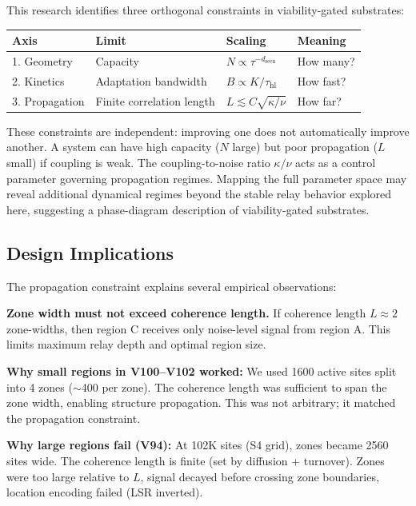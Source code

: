 \documentclass[11pt]{article}
\begin{document}
This research identifies three orthogonal constraints in viability-gated substrates:

\begin{table}[h]
\centering
\begin{tabular}{llll}
\hline
\textbf{Axis} & \textbf{Limit} & \textbf{Scaling} & \textbf{Meaning} \\
\hline
1. Geometry & Capacity & $N \propto \tau^{-d_{\text{seen}}}$ & How many? \\
2. Kinetics & Adaptation bandwidth & $B \propto K / \tau_{\text{hl}}$ & How fast? \\
3. Propagation & Finite correlation length & $L \lesssim C\sqrt{\kappa/\nu}$ & How far? \\
\hline
\end{tabular}
\end{table}

These constraints are independent: improving one does not automatically improve another. A system can have high capacity ($N$ large) but poor propagation ($L$ small) if coupling is weak.
The coupling-to-noise ratio $\kappa/\nu$ acts as a control parameter governing propagation regimes. Mapping the full parameter space may reveal additional dynamical regimes beyond the stable relay behavior explored here, suggesting a phase-diagram description of viability-gated substrates.

\subsection{Design Implications}

The propagation constraint explains several empirical observations:

\textbf{Zone width must not exceed coherence length.} If coherence length $L \approx 2$ zone-widths, then region C receives only noise-level signal from region A. This limits maximum relay depth and optimal region size.

\textbf{Why small regions in V100--V102 worked:} We used 1600 active sites split into 4 zones ($\sim$400 per zone). The coherence length was sufficient to span the zone width, enabling structure propagation. This was not arbitrary; it matched the propagation constraint.

\textbf{Why large regions fail (V94):} At 102K sites (S4 grid), zones became 2560 sites wide. The coherence length is finite (set by diffusion + turnover). Zones were too large relative to $L$, signal decayed before crossing zone boundaries, location encoding failed (LSR inverted).
\end{document}

